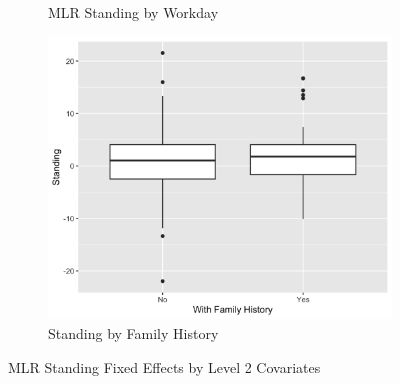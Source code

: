 \documentclass[12pt,twoside,leqno,fleqn,letterpaper]{article}
\theoremstyle{definition}
\theoremstyle{definition}
\begin{document}
\begin{figure}
\begin{subfigure}[b]{0.32\textwidth}
                \caption[]%
                {{\small MLR Standing by Workday}}
                \label{fig: stand v day}
                \end{subfigure}
                \hfill
                \begin{subfigure}[b]{0.32\textwidth}
                \centering
                \includegraphics[width=\textwidth]{pics/mlr stand by fh.png}
                \caption[]%
                {{\small Standing by Family History}}
                \label{fig: int v fh}
                \end{subfigure}
                \caption[]
                {\small MLR Standing Fixed Effects by Level 2 Covariates}
                \label{fig: stand v lv2}
                \end{figure}
            
\end{document}
